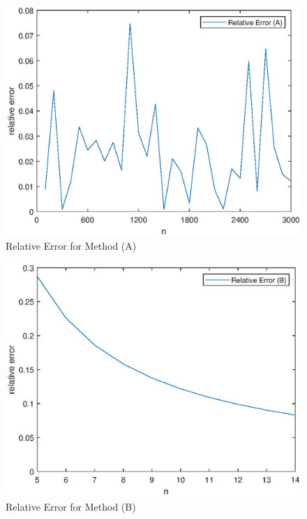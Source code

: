 \documentclass[11pt]{article}
\newcommand{\1}{\mathbbm{1}}
\begin{document}
\begin{figure}[h]
	\centering
		\includegraphics[width=5in]{fig1.eps}
	\caption{Relative Error for Method (A)}
	\label{fig:1}
\end{figure}
\begin{figure}[h]
	\centering
		\includegraphics[width=5in]{fig2.eps}
	\caption{Relative Error for Method (B)}
	\label{fig:2}
\end{figure}
\end{document}
